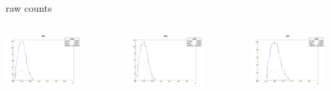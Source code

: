 \begin{frame}{raw counts}
\begin{columns}
\begin{column}[T]{0.25\textwidth}
\includegraphics[width = 0.7\textwidth]{results/yield/statistics/yield_x_Q2_z_0.60_4.775_0.40_pos.png}
\end{column}
\begin{column}[T]{0.25\textwidth}
\includegraphics[width = 0.7\textwidth]{results/yield/statistics/yield_x_Q2_z_0.60_4.775_0.40_neg.png}
\end{column}
\begin{column}[T]{0.25\textwidth}
\includegraphics[width = 0.7\textwidth]{results/yield/statistics/yield_x_Q2_z_0.60_4.775_0.50_pos.png}

\end{column}
\end{columns}
\end{frame}

